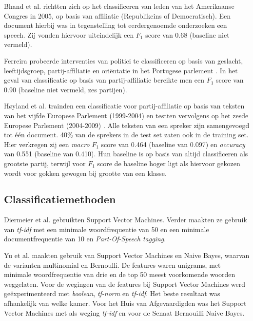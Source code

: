 Bhand et al. \cite{bhand} richtten zich op het classificeren van leden van het Amerikaanse Congres in 2005, op basis van affiliatie (Republikeins of Democratisch). Een document hierbij was in tegenstelling tot eerdergenoemde onderzoeken een speech. Zij vonden hiervoor uiteindelijk een $F_1$ score van 0.68 (baseline niet vermeld).\par

Ferreira \cite{Ferreira2016UsingTT} probeerde interventies van politici te classificeren op basis van geslacht, leeftijdsgroep, partij-affiliatie en oriëntatie in het Portugese parlement . In het geval van classificatie op basis van partij-affiliatie bereikte men een $F_1$ score van 0.90 (baseline niet vermeld, zes partijen).\par

Høyland et al. trainden een classificatie voor partij-affiliatie op basis van teksten van het vijfde Europese Parlement (1999-2004) en testten vervolgens op het zesde Europese Parlement (2004-2009) \cite{W14-2516}. Alle teksten van een spreker zijn samengevoegd tot één document. 40\% van de sprekers in de test set zaten ook in de training set. Hier verkregen zij een \textit{macro} $F_1$ score van 0.464 (baseline van 0.097) en \textit{accuracy} van 0.551 (baseline van 0.410). Hun baseline is op basis van altijd classificeren als grootste partij, terwijl voor $F_1$ score de baseline hoger ligt als hiervoor gekozen wordt voor gokken gewogen bij grootte van een klasse. \par

\subsection{Classificatiemethoden}
\label{sec:Deelvraag1}
Diermeier et al. \cite{diermeier_godbout_yu_kaufmann_2012} gebruikten Support Vector Machines. Verder maakten ze gebruik van \textit{tf-idf} met een minimale woordfrequentie van 50 en een minimale documentfrequentie van 10 en \textit{Part-Of-Speech tagging}.\par
Yu et al. \cite{doi:10.1080/19331680802149608} maakten gebruik van Support Vector Machines en Naive Bayes, waarvan de varianten multinomial en Bernoulli. De features waren unigrams, met minimale woordfrequentie van drie en de top 50 meest voorkomende woorden weggelaten. Voor de wegingen van de features bij Support Vector Machines werd geëxperimenteerd met \textit{boolean}, \textit{tf-norm} en \textit{tf-idf}. Het beste resultaat was afhankelijk van welke kamer. Voor het Huis van Afgevaardigden was het Support Vector Machines met als weging \textit{tf-idf} en voor de Senaat Bernouilli Naive Bayes.

